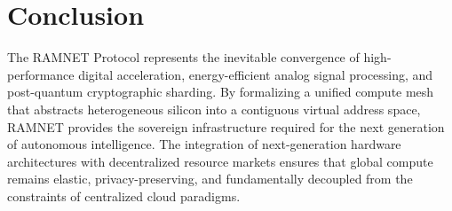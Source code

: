 \documentclass[conference]{IEEEtran}
\begin{document}
\section{Conclusion}
The RAMNET Protocol represents the inevitable convergence of high-performance digital acceleration, energy-efficient analog signal processing, and post-quantum cryptographic sharding. By formalizing a unified compute mesh that abstracts heterogeneous silicon into a contiguous virtual address space, RAMNET provides the sovereign infrastructure required for the next generation of autonomous intelligence. The integration of next-generation hardware architectures with decentralized resource markets ensures that global compute remains elastic, privacy-preserving, and fundamentally decoupled from the constraints of centralized cloud paradigms.



\end{document}
